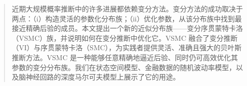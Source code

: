 \begin{abstract}
近期大规模概率推断中的许多进展都依赖变分方法。变分方法的成功取决于两点：（i）构造灵活的参数化分布族；（ii）优化参数，从该分布族中找到最接近精确后验的成员。本文提出一个新的近似分布族——变分序贯蒙特卡洛（VSMC）族，并说明如何在变分推断中优化它。VSMC 融合了变分推断（VI）与序贯蒙特卡洛（SMC），为实践者提供灵活、准确且强大的贝叶斯推断方法。VSMC 是一种能够任意精确地逼近后验、同时仍可高效优化其参数的变分分布族。我们在状态空间模型、金融数据的随机波动率模型，以及脑神经回路的深度马尔可夫模型上展示了它的用途。
\end{abstract}
